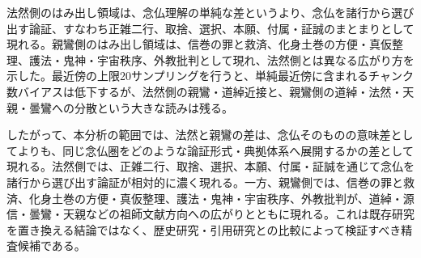 \documentclass[uplatex,dvipdfmx,11pt,a4paper]{jsarticle}
\begin{document}
法然側のはみ出し領域は、念仏理解の単純な差というより、念仏を諸行から選び出す論証、すなわち正雑二行、取捨、選択、本願、付属・証誠のまとまりとして現れる。親鸞側のはみ出し領域は、信巻の罪と救済、化身土巻の方便・真仮整理、護法・鬼神・宇宙秩序、外教批判として現れ、法然側とは異なる広がり方を示した。最近傍の上限20サンプリングを行うと、単純最近傍に含まれるチャンク数バイアスは低下するが、法然側の親鸞・道綽近接と、親鸞側の道綽・法然・天親・曇鸞への分散という大きな読みは残る。

したがって、本分析の範囲では、法然と親鸞の差は、念仏そのものの意味差としてよりも、同じ念仏圏をどのような論証形式・典拠体系へ展開するかの差として現れる。法然側では、正雑二行、取捨、選択、本願、付属・証誠を通じて念仏を諸行から選び出す論証が相対的に濃く現れる。一方、親鸞側では、信巻の罪と救済、化身土巻の方便・真仮整理、護法・鬼神・宇宙秩序、外教批判が、道綽・源信・曇鸞・天親などの祖師文献方向への広がりとともに現れる。これは既存研究を置き換える結論ではなく、歴史研究・引用研究との比較によって検証すべき精査候補である。
\end{document}
